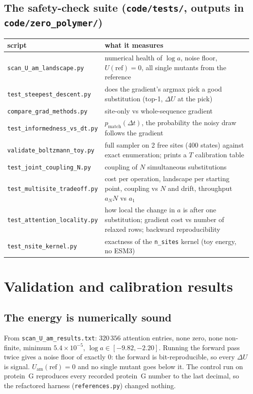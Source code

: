\documentclass[11pt,a4paper]{article}
\newcommand{\dt}{\Delta t}
\newcommand{\Uam}{U_{\mathrm{am}}}
\newcommand{\file}[1]{\texttt{#1}}
\begin{document}
\subsection{The safety-check suite (\file{code/tests/}, outputs in \file{code/zero\_polymer/})}
\begin{center}
\small
\begin{tabular}{@{}p{}p{}@{}}
\toprule
script & what it measures \\
\midrule
\file{scan\_U\_am\_landscape.py} & numerical health of $\log a$, noise floor, $U(\mathrm{ref})=0$, all single mutants from the reference \\
\file{test\_steepest\_descent.py} & does the gradient's argmax pick a good substitution (top-1, $\Delta U$ at the pick) \\
\file{compare\_grad\_methods.py} & site-only vs whole-sequence gradient \\
\file{test\_informedness\_vs\_dt.py} & $p_{\mathrm{match}}(\dt)$, the probability the noisy draw follows the gradient \\
\file{validate\_boltzmann\_toy.py} & full sampler on 2 free sites (400 states) against exact enumeration; prints a $T$ calibration table \\
\file{test\_joint\_coupling\_N.py} & coupling of $N$ simultaneous substitutions \\
\file{test\_multisite\_tradeoff.py} & cost per operation, landscape per starting point, coupling vs $N$ and drift, throughput $a_N N$ vs $a_1$ \\
\file{test\_attention\_locality.py} & how local the change in $a$ is after one substitution; gradient cost vs number of relaxed rows; backward reproducibility \\
\file{test\_nsite\_kernel.py} & exactness of the \texttt{n\_sites} kernel (toy energy, no ESM3) \\
\bottomrule
\end{tabular}
\end{center}

\section{Validation and calibration results}
\subsection{The energy is numerically sound}
From \file{scan\_U\_am\_results.txt}: $320\,356$ attention entries, none zero, none
non-finite, minimum $5.4\times10^{-5}$, $\log a\in[-9.82,-2.20]$. Running the
forward pass twice gives a noise floor of exactly 0: the forward is
bit-reproducible, so every $\Delta U$ is signal. $\Uam(\mathrm{ref})=0$ and no
single mutant goes below it. The control run on protein~G reproduces every
recorded protein~G number to the last decimal, so the refactored harness
(\file{references.py}) changed nothing.
\end{document}
